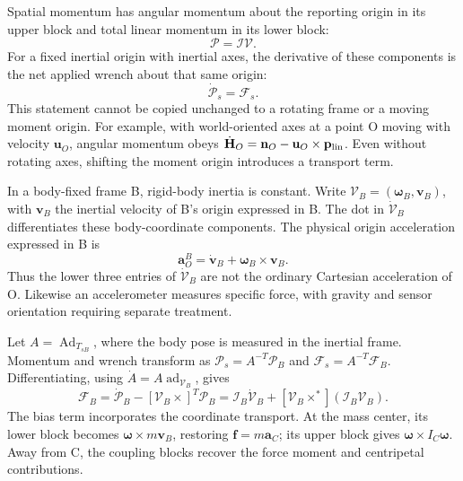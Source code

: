 Spatial momentum has angular momentum about the reporting origin in its upper block and total linear momentum in its lower block:
\begin{equation}
\mathcal P=\mathcal I\mathcal V.
\label{eq:spatial_momentum}
\end{equation}
For a fixed inertial origin with inertial axes, the derivative of these components is the net applied wrench about that same origin:
\begin{equation}
\dot{\mathcal P}_s=\mathcal F_s.
\label{eq:spatial_newton_euler_basic}
\end{equation}
This statement cannot be copied unchanged to a rotating frame or a moving moment origin. For example, with world-oriented axes at a point O moving with velocity $\mathbf u_O$, angular momentum obeys $\dot{\mathbf H}_O=\mathbf n_O-\mathbf u_O\times\mathbf p_{\rm lin}$. Even without rotating axes, shifting the moment origin introduces a transport term.

In a body-fixed frame B, rigid-body inertia is constant. Write $\mathcal V_B=(\boldsymbol\omega_B,\mathbf v_B)$, with $\mathbf v_B$ the inertial velocity of B's origin expressed in B. The dot in $\dot{\mathcal V}_B$ differentiates these body-coordinate components. The physical origin acceleration expressed in B is
\begin{equation}
\mathbf a_O^B=\dot{\mathbf v}_B+\boldsymbol\omega_B\times\mathbf v_B.
\end{equation}
Thus the lower three entries of $\dot{\mathcal V}_B$ are not the ordinary Cartesian acceleration of O. Likewise an accelerometer measures specific force, with gravity and sensor orientation requiring separate treatment.

Let $A=\operatorname{Ad}_{T_{sB}}$, where the body pose is measured in the inertial frame. Momentum and wrench transform as $\mathcal P_s=A^{-T}\mathcal P_B$ and $\mathcal F_s=A^{-T}\mathcal F_B$. Differentiating, using $\dot A=A\operatorname{ad}_{\mathcal V_B}$, gives
\label{thm:spatial_ne_theorem}
\begin{equation}
\mathcal F_B=\dot{\mathcal P}_B-[\mathcal V_B\times]^T\mathcal P_B
=\mathcal I_B\dot{\mathcal V}_B+[\mathcal V_B\times^*](\mathcal I_B\mathcal V_B).
\label{eq:spatial_newton_euler_final}
\end{equation}
The bias term incorporates the coordinate transport. At the mass center, its lower block becomes $\boldsymbol\omega\times m\mathbf v_B$, restoring $\mathbf f=m\mathbf a_C$; its upper block gives $\boldsymbol\omega\times I_C\boldsymbol\omega$. Away from C, the coupling blocks recover the force moment and centripetal contributions.

